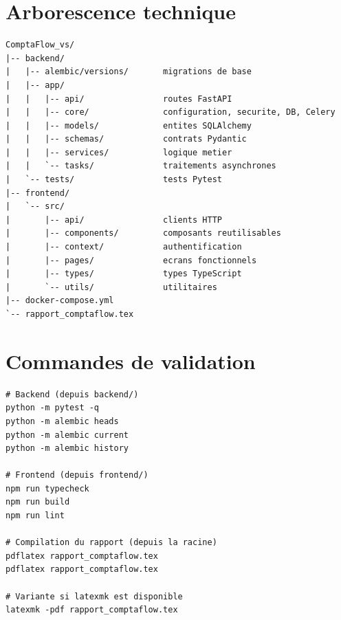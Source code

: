 \documentclass[12pt,a4paper,oneside]{report}
\begin{document}
\chapter{Arborescence technique}

\begin{lstlisting}
ComptaFlow_vs/
|-- backend/
|   |-- alembic/versions/       migrations de base
|   |-- app/
|   |   |-- api/                routes FastAPI
|   |   |-- core/               configuration, securite, DB, Celery
|   |   |-- models/             entites SQLAlchemy
|   |   |-- schemas/            contrats Pydantic
|   |   |-- services/           logique metier
|   |   `-- tasks/              traitements asynchrones
|   `-- tests/                  tests Pytest
|-- frontend/
|   `-- src/
|       |-- api/                clients HTTP
|       |-- components/         composants reutilisables
|       |-- context/            authentification
|       |-- pages/              ecrans fonctionnels
|       |-- types/              types TypeScript
|       `-- utils/              utilitaires
|-- docker-compose.yml
`-- rapport_comptaflow.tex
\end{lstlisting}

\chapter{Commandes de validation}

\begin{lstlisting}
# Backend (depuis backend/)
python -m pytest -q
python -m alembic heads
python -m alembic current
python -m alembic history

# Frontend (depuis frontend/)
npm run typecheck
npm run build
npm run lint

# Compilation du rapport (depuis la racine)
pdflatex rapport_comptaflow.tex
pdflatex rapport_comptaflow.tex

# Variante si latexmk est disponible
latexmk -pdf rapport_comptaflow.tex
\end{lstlisting}
\end{document}
